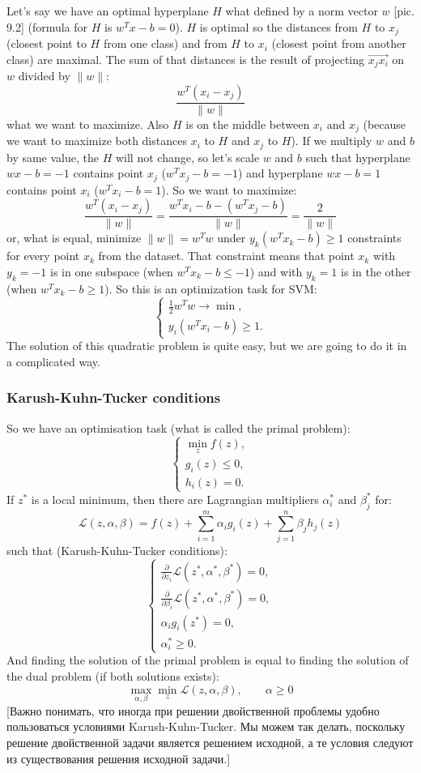 Let's say we have an optimal hyperplane $H$ what defined by a norm vector $w$ [pic. 9.2] (formula for $H$ is $w^Tx-b=0$). $H$ is optimal so the distances from $H$ to $x_j$ (closest point to $H$ from one class) and from $H$ to $x_i$ (closest point from another class) are maximal. The sum of that distances is the result of projecting $\overrightarrow{x_jx_i}$ on $w$ divided by $\|w\|$:
$$\frac{w^T(x_i-x_j)}{\|w\|}$$
what we want to maximize. Also $H$ is on the middle between $x_i$ and $x_j$ (because we want to maximize both distances $x_i$ to $H$ and $x_j$ to $H$). If we multiply $w$ and $b$ by same value, the $H$ will not change, so let's scale $w$ and $b$ such that hyperplane $wx-b=-1$ contains point $x_j$ ($w^Tx_j-b=-1$) and hyperplane $wx-b=1$ contains point $x_i$ ($w^Tx_i-b=1$). So we want to maximize:
$$\frac{w^T(x_i-x_j)}{\|w\|}=\frac{w^Tx_i-b-(w^Tx_j-b)}{\|w\|}=\frac{2}{\|w\|}$$
or, what is equal, minimize $\|w\|=w^Tw$ under $y_k(w^Tx_k-b)\ge 1$ constraints for every point $x_k$ from the dataset. That constraint means that point $x_k$ with $y_k=-1$ is in one subspace (when $w^Tx_k-b\le-1$) and with $y_k=1$ is in the other (when $w^Tx_k-b\ge1$). So this is an optimization task for SVM:
$$\begin{cases}
	\frac{1}{2}w^Tw\to\min, \\
	y_i(w^Tx_i-b)\ge1.
\end{cases}$$
The solution of this quadratic problem is quite easy, but we are going to do it in a complicated way.

\subsubsection*{Karush-Kuhn-Tucker conditions}

So we have an optimisation task (what is called the primal problem):
$$\begin{cases}
	\min\limits_{z}f(z), \\
	g_i(z)\le0, \\
	h_i(z)=0.
\end{cases}$$
If $z^*$ is a local minimum, then there are Lagrangian multipliers $\alpha_i^*$ and $\beta_j^*$ for:
$$\mathcal{L}(z,\alpha,\beta)=f(z)+\sum\limits_{i=1}^{m}\alpha_i g_i(z)+\sum\limits_{j=1}^{n}\beta_jh_j(z)$$
such that (Karush-Kuhn-Tucker conditions):
$$\begin{cases}
	\frac{\partial}{\partial z_i}\mathcal{L}(z^*,\alpha^*,\beta^*)=0, \\
	\frac{\partial}{\partial \beta_i}\mathcal{L}(z^*,\alpha^*,\beta^*)=0, \\
	\alpha_i g_i(z^*)=0, \\
	\alpha_i^*\ge0.
\end{cases}$$
And finding the solution of the primal problem is equal to finding the solution of the dual problem (if both solutions exists):
$$\max\limits_{\alpha,\beta}\min\limits_{z}\mathcal{L}(z,\alpha,\beta),\qquad\alpha\ge0$$
[Важно понимать, что иногда при решении двойственной проблемы удобно пользоваться условиями Karush-Kuhn-Tucker. Мы можем так делать, поскольку решение двойственной задачи является решением исходной, а те условия следуют из существования решения исходной задачи.]

